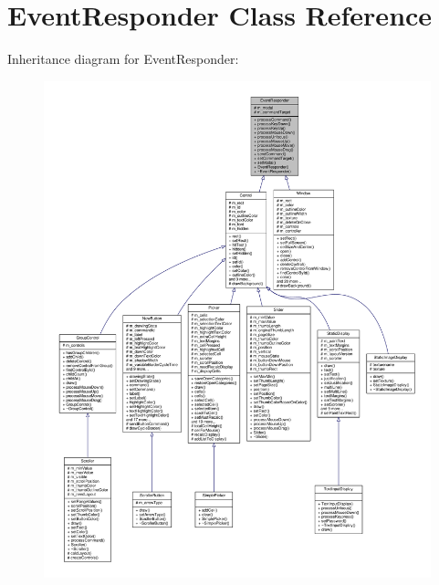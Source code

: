 \hypertarget{classEventResponder}{}\section{Event\+Responder Class Reference}
\label{classEventResponder}


Inheritance diagram for Event\+Responder\+:
\nopagebreak
\begin{figure}[H]
\begin{center}
\leavevmode
\includegraphics[width=350pt]{dc/d59/classEventResponder__inherit__graph}
\end{center}
\end{figure}


